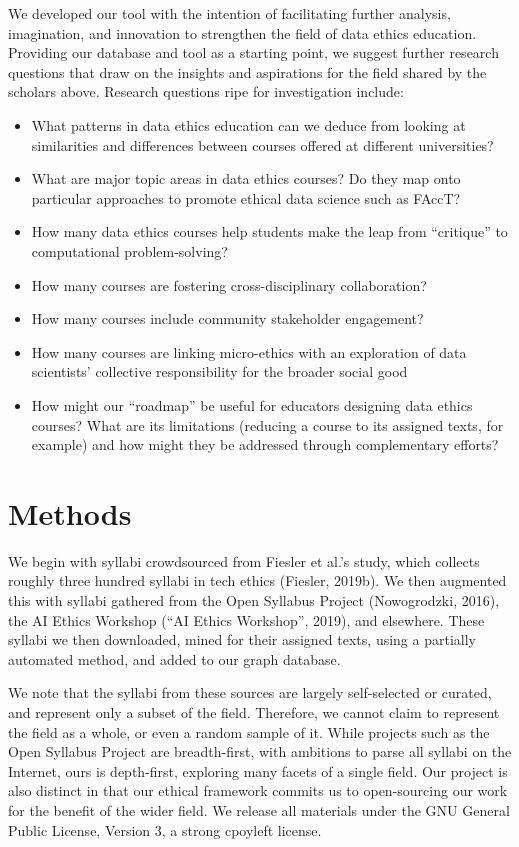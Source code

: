 \documentclass[
]{article}
\providecommand{\tightlist}{%
  \setlength{\itemsep}{0pt}\setlength{\parskip}{0pt}}
\begin{document}
We developed our tool with the intention of facilitating further
analysis, imagination, and innovation to strengthen the field of data
ethics education. Providing our database and tool as a starting point,
we suggest further research questions that draw on the insights and
aspirations for the field shared by the scholars above. Research
questions ripe for investigation include:

\begin{itemize}
\tightlist
\item
  What patterns in data ethics education can we deduce from looking at
  similarities and differences between courses offered at different
  universities?
\item
  What are major topic areas in data ethics courses? Do they map onto
  particular approaches to promote ethical data science such as FAccT?
\item
  How many data ethics courses help students make the leap from
  ``critique'' to computational problem-solving?
\item
  How many courses are fostering cross-disciplinary collaboration?
\item
  How many courses include community stakeholder engagement?
\item
  How many courses are linking micro-ethics with an exploration of data
  scientists' collective responsibility for the broader social good
\item
  How might our ``roadmap'' be useful for educators designing data
  ethics courses? What are its limitations (reducing a course to its
  assigned texts, for example) and how might they be addressed through
  complementary efforts?
\end{itemize}

\hypertarget{methods}{%
\section{Methods}\label{methods}}

We begin with syllabi crowdsourced from Fiesler et al.'s study, which
collects roughly three hundred syllabi in tech ethics (Fiesler, 2019b).
We then augmented this with syllabi gathered from the Open Syllabus
Project (Nowogrodzki, 2016), the AI Ethics Workshop ({``{AI} {Ethics}
{Workshop}''}, 2019), and elsewhere. These syllabi we then downloaded,
mined for their assigned texts, using a partially automated method, and
added to our graph database.

We note that the syllabi from these sources are largely self-selected or
curated, and represent only a subset of the field. Therefore, we cannot
claim to represent the field as a whole, or even a random sample of it.
While projects such as the Open Syllabus Project are breadth-first, with
ambitions to parse all syllabi on the Internet, ours is depth-first,
exploring many facets of a single field. Our project is also distinct in
that our ethical framework commits us to open-sourcing our work for the
benefit of the wider field. We release all materials under the GNU
General Public License, Version 3, a strong cpoyleft license.
\end{document}
